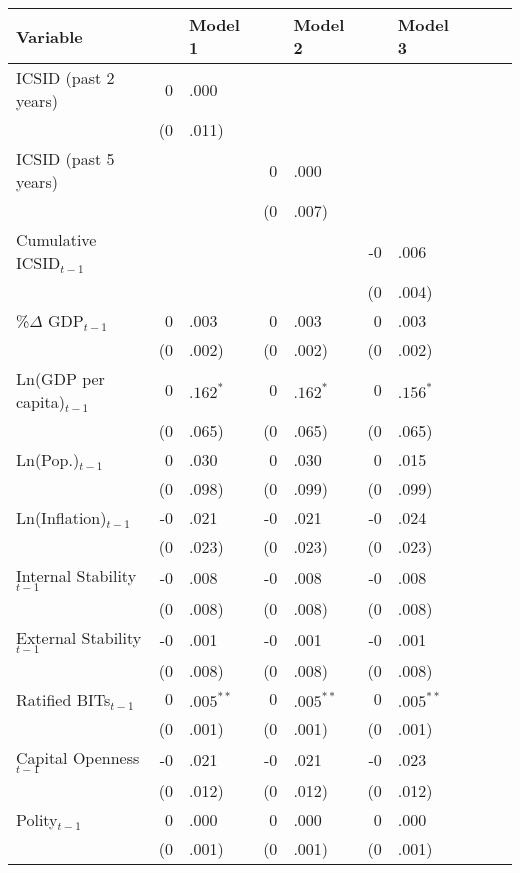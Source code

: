 \documentclass[12pt,onesided]{amsart}
\begin{document}
\begin{table}[ht]
\centering
{\footnotesize
\begin{tabular}{lr@{} lr@{}lr@{}lr@{}lr@{}}
 Variable && Model 1 && Model 2 && Model 3 \\ 
  \hline
\hline
ICSID (past 2 years) & 0&.000 &&  &&  \\ 
   & (0&.011) &&  &&  \\ 
  ICSID (past 5 years) &&  & 0&.000 &&  \\ 
   &&  & (0&.007) &&  \\ 
  Cumulative ICSID$_{t-1}$ &&  &&  & -0&.006 \\ 
   &&  &&  & (0&.004) \\ 
  \%$\Delta$ GDP$_{t-1}$ & 0&.003 & 0&.003 & 0&.003 \\ 
   & (0&.002) & (0&.002) & (0&.002) \\ 
  Ln(GDP per capita)$_{t-1}$ & $0$&$.162^{\ast}$ & $0$&$.162^{\ast}$ & $0$&$.156^{\ast}$ \\ 
   & (0&.065) & (0&.065) & (0&.065) \\ 
  Ln(Pop.)$_{t-1}$ & 0&.030 & 0&.030 & 0&.015 \\ 
   & (0&.098) & (0&.099) & (0&.099) \\ 
  Ln(Inflation)$_{t-1}$ & -0&.021 & -0&.021 & -0&.024 \\ 
   & (0&.023) & (0&.023) & (0&.023) \\ 
  Internal Stability$_{t-1}$ & -0&.008 & -0&.008 & -0&.008 \\ 
   & (0&.008) & (0&.008) & (0&.008) \\ 
  External Stability$_{t-1}$ & -0&.001 & -0&.001 & -0&.001 \\ 
   & (0&.008) & (0&.008) & (0&.008) \\ 
  Ratified BITs$_{t-1}$ & $0$&$.005^{\ast\ast}$ & $0$&$.005^{\ast\ast}$ & $0$&$.005^{\ast\ast}$ \\ 
   & (0&.001) & (0&.001) & (0&.001) \\ 
  Capital Openness$_{t-1}$ & -0&.021 & -0&.021 & -0&.023 \\ 
   & (0&.012) & (0&.012) & (0&.012) \\ 
  Polity$_{t-1}$ & 0&.000 & 0&.000 & 0&.000 \\ 
   & (0&.001) & (0&.001) & (0&.001) \\ 

\end{tabular}}
\end{table}
\end{document}
